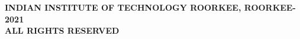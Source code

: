 \thispagestyle{empty}
\vspace*{80mm}
{
 \begin{center}
 	{
 		\bfseries
 		\selectfont\textcopyright INDIAN INSTITUTE OF TECHNOLOGY ROORKEE, ROORKEE-2021\\
		ALL RIGHTS RESERVED
	}
 \end{center}
}
